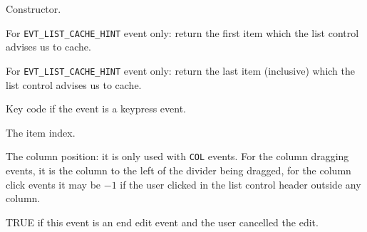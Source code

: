 




Constructor.

\label{wxlisteventgetcachefrom}


For {\tt EVT\_LIST\_CACHE\_HINT} event only: return the first item which the
list control advises us to cache.

\label{wxlisteventgetcacheto}


For {\tt EVT\_LIST\_CACHE\_HINT} event only: return the last item (inclusive)
which the list control advises us to cache.

\label{wxlisteventgetcode}


Key code if the event is a keypress event.

\label{wxlisteventgetindex}


The item index.

\label{wxlisteventgetcolumn}


The column position: it is only used with {\tt COL} events. For the column
dragging events, it is the column to the left of the divider being dragged, for
the column click events it may be $-1$ if the user clicked in the list control
header outside any column.

\label{wxlisteventcancelled}


TRUE if this event is an end edit event and the user cancelled the edit.

\label{wxlisteventgetpoint}


